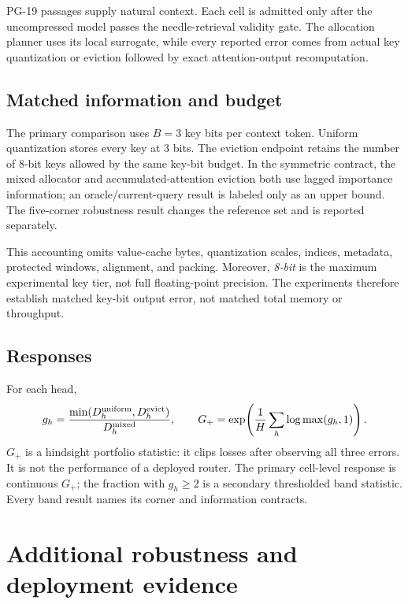 PG-19 passages supply natural context.  Each cell is admitted only after the
uncompressed model passes the needle-retrieval validity gate.  The allocation
planner uses its local surrogate, while every reported error comes from actual
key quantization or eviction followed by exact attention-output recomputation.

\subsection{Matched information and budget}

The primary comparison uses $B=3$ key bits per context token.  Uniform
quantization stores every key at 3 bits.  The eviction endpoint retains the
number of 8-bit keys allowed by the same key-bit budget.  In the symmetric
contract, the mixed allocator and accumulated-attention eviction both use lagged
importance information; an oracle/current-query result is labeled only as an
upper bound.  The five-corner robustness result changes the reference set and is
reported separately.

This accounting omits value-cache bytes, quantization scales, indices, metadata,
protected windows, alignment, and packing.  Moreover, \emph{8-bit} is the maximum
experimental key tier, not full floating-point precision.  The experiments
therefore establish matched key-bit output error, not matched total memory or
throughput.

\subsection{Responses}

For each head,
\[
 g_h=
 \frac{\min(D_h^{\rm uniform},D_h^{\rm evict})}
 {D_h^{\rm mixed}},
 \qquad
 G_+=\exp\!\left(\frac1H\sum_h\log\max(g_h,1)\right).
\]
$G_+$ is a hindsight portfolio statistic: it clips losses after observing all
three errors.  It is not the performance of a deployed router.  The primary
cell-level response is continuous $G_+$; the fraction with $g_h\ge2$ is a
secondary thresholded band statistic.  Every band result names its corner
and information contracts.

\section{Additional robustness and deployment evidence}
\label{app:robustness}

